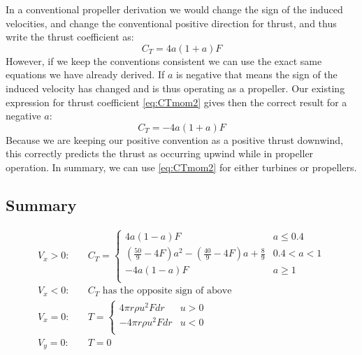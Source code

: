 \documentclass{article}
\begin{document}
In a conventional propeller derivation we would change the sign of the induced velocities, and change the conventional positive direction for thrust, and thus write the thrust coefficient as:
\begin{equation}
    C_T = 4 a (1 + a) F
\end{equation}
However, if we keep the conventions consistent we can use the exact same equations we have already derived.  If $a$ is negative that means the sign of the induced velocity has changed and is thus operating as a propeller.  Our existing expression for thrust coefficient \cref{eq:CTmom2} gives then the correct result for a negative $a$:
\begin{equation}
    C_T = - 4 a (1 + a) F
\end{equation}
Because we are keeping our positive convention as a positive thrust downwind, this correctly predicts the thrust as occurring upwind while in propeller operation.  In summary, we can use \cref{eq:CTmom2} for either turbines or propellers.

\subsection{Summary}
\label{sec:momsum}

\begin{equation}
\begin{aligned}
    V_x > 0:&\quad
    C_T =
    \begin{cases}
        4 a (1 - a) F &  a \le 0.4 \\
        \left(\frac{50}{9} - 4F\right) a^2 - \left(\frac{40}{9} - 4F\right) a + \frac{8}{9} &  0.4 < a < 1 \\
        -4 a (1 - a) F &  a \ge 1 \\
    \end{cases}\\
    V_x < 0:&\quad C_T \text{ has the opposite sign of above}\\
    V_x = 0:&\quad  T =
        \begin{cases}
        4 \pi r \rho u^2 F dr & u > 0\\
        -4 \pi r \rho u^2 F dr & u < 0\\
        \end{cases}\\
    V_y = 0:&\quad T = 0\\
\end{aligned}
\label{eq:CTmomsum}
\end{equation}
\end{document}
